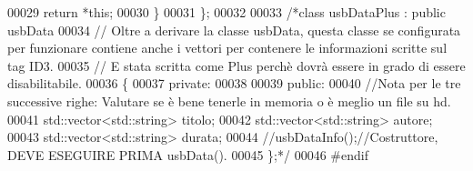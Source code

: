 \begin{DoxyCode}
00029         \textcolor{keywordflow}{return} *\textcolor{keyword}{this};
00030     \}
00031 \};
00032 
00033 \textcolor{comment}{/*class usbDataPlus : public usbData}
00034 \textcolor{comment}{// Oltre a derivare la classe usbData, questa classe se configurata per
       funzionare contiene anche i vettori per contenere le informazioni scritte sul tag ID3.}
00035 \textcolor{comment}{// E stata scritta come Plus perchè dovrà essere in grado di essere
       disabilitabile.}
00036 \textcolor{comment}{\{}
00037 \textcolor{comment}{private:}
00038 \textcolor{comment}{}
00039 \textcolor{comment}{public:}
00040 \textcolor{comment}{    //Nota per le tre successive righe: Valutare se è bene tenerle in memoria o
       è meglio un file su hd.}
00041 \textcolor{comment}{    std::vector<std::string> titolo;}
00042 \textcolor{comment}{    std::vector<std::string> autore;}
00043 \textcolor{comment}{    std::vector<std::string> durata;}
00044 \textcolor{comment}{    //usbDataInfo();//Costruttore, DEVE ESEGUIRE PRIMA usbData().}
00045 \textcolor{comment}{\};*/}
00046 \textcolor{preprocessor}{#endif}
\end{DoxyCode}
